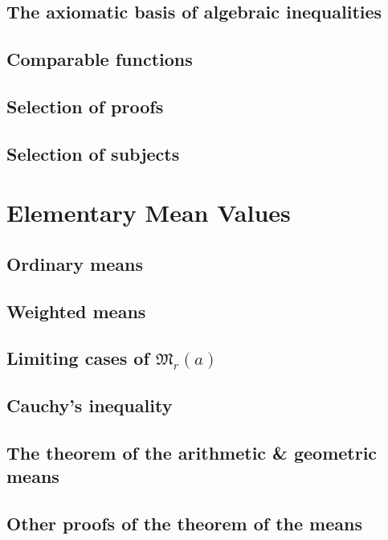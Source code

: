 \documentclass[oneside]{book}
\numberwithin{equation}{section}
\begin{document}
\subsection{The axiomatic basis of algebraic inequalities}

\subsection{Comparable functions}

\subsection{Selection of proofs}

\subsection{Selection of subjects}


\section{Elementary Mean Values}

\subsection{Ordinary means}

\subsection{Weighted means}

\subsection{Limiting cases of $\mathfrak{M}_r(a)$}

\subsection{Cauchy's inequality}

\subsection{The theorem of the arithmetic \& geometric means}

\subsection{Other proofs of the theorem of the means}
\end{document}
